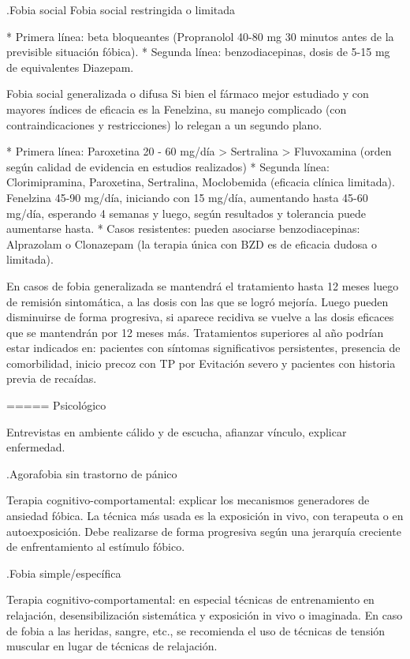 \documentclass{scrbook}
\begin{document}
.Fobia social
Fobia social restringida o limitada

* Primera línea: beta bloqueantes (Propranolol 40-80 mg 30 minutos antes de la previsible situación fóbica).
* Segunda línea: benzodiacepinas, dosis de 5-15 mg de equivalentes Diazepam.

Fobia social generalizada o difusa Si bien el fármaco mejor estudiado y con mayores índices de eficacia es la Fenelzina, su manejo complicado (con contraindicaciones y restricciones) lo relegan a un segundo plano.

* Primera línea: Paroxetina 20 - 60 mg/día > Sertralina > Fluvoxamina (orden según calidad de evidencia en estudios realizados)
* Segunda línea: Clorimipramina, Paroxetina, Sertralina, Moclobemida (eficacia clínica limitada). Fenelzina 45-90 mg/día, iniciando con 15 mg/día, aumentando hasta 45-60 mg/día, esperando 4 semanas y luego, según resultados y tolerancia puede aumentarse hasta.
* Casos resistentes: pueden asociarse benzodiacepinas: Alprazolam o Clonazepam (la terapia única con BZD es de eficacia dudosa o limitada).

En casos de fobia generalizada se mantendrá el tratamiento hasta 12 meses luego de remisión sintomática, a las dosis con las que se logró mejoría. Luego pueden disminuirse de forma progresiva, si aparece recidiva se vuelve a las dosis eficaces que se mantendrán por 12 meses más. Tratamientos superiores al año podrían estar indicados en: pacientes con síntomas significativos persistentes, presencia de comorbilidad, inicio precoz con TP por Evitación severo y pacientes con historia previa de recaídas.

===== Psicológico

Entrevistas en ambiente cálido y de escucha, afianzar vínculo, explicar enfermedad.

.Agorafobia sin trastorno de pánico

Terapia cognitivo-comportamental: explicar los mecanismos generadores de ansiedad fóbica. La técnica más usada es la exposición in vivo, con terapeuta o en autoexposición. Debe realizarse de forma progresiva según una jerarquía creciente de enfrentamiento al estímulo fóbico.

.Fobia simple/específica

Terapia cognitivo-comportamental: en especial técnicas de entrenamiento en relajación, desensibilización sistemática y exposición in vivo o imaginada. En caso de fobia a las heridas, sangre, etc., se recomienda el uso de técnicas de tensión muscular en lugar de técnicas de relajación.
\end{document}
